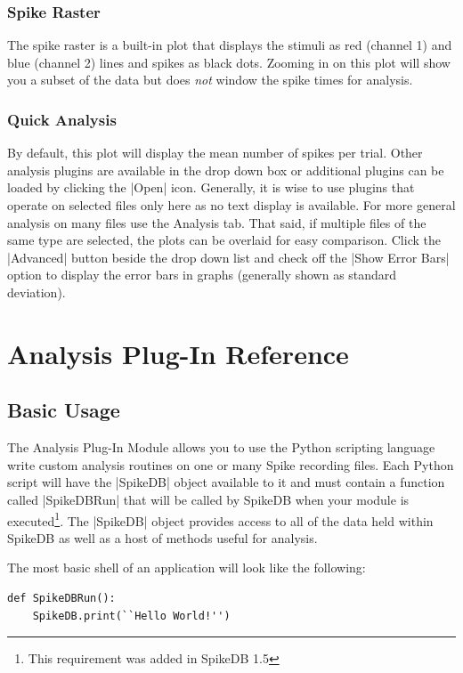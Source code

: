 \documentclass{report}
\begin{document}
\subsection{Spike Raster}
The spike raster is a built-in plot that displays the stimuli as red (channel 1) and blue (channel 2) lines and spikes as black dots. Zooming in on this plot will show you a subset of the data but does \emph{not} window the spike times for analysis. 

\subsection{Quick Analysis}
By default, this plot will display the mean number of spikes per trial. Other analysis plugins are available in the drop down box or additional plugins can be loaded by clicking the |Open| icon. Generally, it is wise to use plugins that operate on selected files only here as no text display is available. For more general analysis on many files use the Analysis tab. That said, if multiple files of the same type are selected, the plots can be overlaid for easy comparison. Click the |Advanced| button beside the drop down list and check off the |Show Error Bars| option to display the error bars in graphs (generally shown as standard deviation).

\chapter{Analysis Plug-In Reference}
\section{Basic Usage}
The Analysis Plug-In Module allows you to use the Python scripting language write custom analysis routines on one or many Spike recording files. Each Python script will have the |SpikeDB| object available to it and must contain a function called |SpikeDBRun| that will be called by SpikeDB when your module is executed\footnote{This requirement was added in SpikeDB 1.5}.  The |SpikeDB| object provides access to all of the data held within SpikeDB as well as a host of methods useful for analysis.

The most basic shell of an application will look like the following:
\begin{lstlisting}[caption=Example]
def SpikeDBRun():
	SpikeDB.print(``Hello World!'')
\end{lstlisting}
\end{document}
